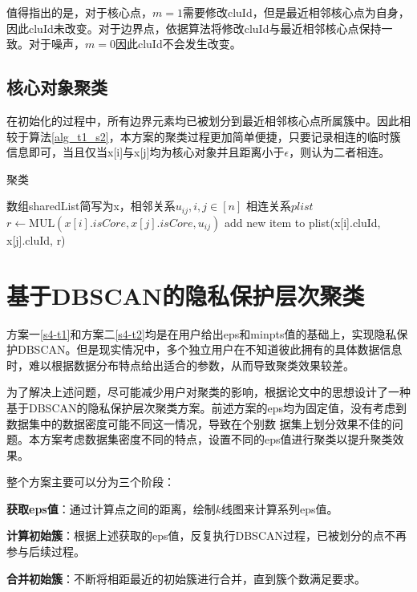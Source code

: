 值得指出的是，对于核心点，$ m = 1 $需要修改cluId，但是最近相邻核心点为自身，因此cluId未改变。对于边界点，依据算法将修改cluId与最近相邻核心点保持一致。对于噪声，$ m=0 $因此cluId不会发生改变。
\subsection{核心对象聚类}
在初始化的过程中，所有边界元素均已被划分到最近相邻核心点所属簇中。因此相较于算法\ref{alg_t1_s2}，本方案的聚类过程更加简单便捷，只要记录相连的临时簇信息即可，当且仅当x[i]与x[j]均为核心对象并且距离小于$ \epsilon $，则认为二者相连。
\begin{algorithm}[htbp]
	\renewcommand{\algorithmicrequire}{\textbf{输入:}}
	\renewcommand{\algorithmicensure}{\textbf{输出:}}
	\caption{聚类}
	\label{alg_t2_s2}
	\begin{algorithmic}[1]
		\REQUIRE 数组sharedList简写为x，相邻关系$ u_{ij},i,j\in[n] $
		\ENSURE 相连关系$ plist $
		\STATE $ r \leftarrow \text{MUL}(x[i].isCore, x[j].isCore, u_{ij}) $
		\STATE add new item to plist(x[i].cluId, x[j].cluId, r)
		\ENDFOR
		\ENDFOR
	\end{algorithmic}
\end{algorithm}
\section{基于DBSCAN的隐私保护层次聚类}
\label{s4-t3}
方案一\ref{s4-t1}和方案二\ref{s4-t2}均是在用户给出eps和minpts值的基础上，实现隐私保护DBSCAN。但是现实情况中，多个独立用户在不知道彼此拥有的具体数据信息时，难以根据数据分布特点给出适合的参数，从而导致聚类效果较差。

为了解决上述问题，尽可能减少用户对聚类的影响，根据论文\cite{latifi2021dbhc}中的思想设计了一种基于DBSCAN的隐私保护层次聚类方案。前述方案的eps均为固定值，没有考虑到数据集中的数据密度可能不同这一情况，导致在个别数 据集上划分效果不佳的问题。本方案考虑数据集密度不同的特点，设置不同的eps值进行聚类以提升聚类效果。

整个方案主要可以分为三个阶段：
\begin{compactitem}
	\item \textbf{获取eps值}：通过计算点之间的距离，绘制$ k$线图来计算系列eps值。
	\item \textbf{计算初始簇}：根据上述获取的eps值，反复执行DBSCAN过程，已被划分的点不再参与后续过程。
	\item \textbf{合并初始簇}：不断将相距最近的初始簇进行合并，直到簇个数满足要求。
\end{compactitem}

